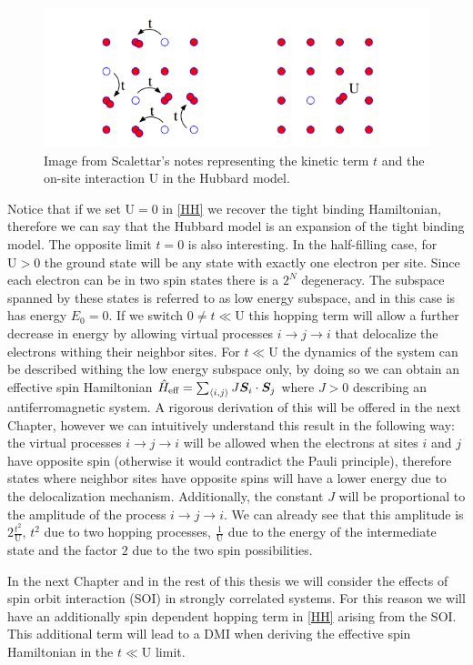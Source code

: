 \begin{figure}
\centering
  \includegraphics[width=\linewidth]{../Figures/hubbard.png}
  \caption{Image from Scalettar's notes representing the kinetic term $t$ and the on-site interaction $\text{U}$ in the Hubbard model.} 
\label{fig:Hubbard}
\end{figure}
Notice that if we set $\text{U}=0$ in \ref{HH} we recover the tight binding Hamiltonian, therefore we can say that the Hubbard model is an expansion of the tight binding model. The opposite limit $t=0$ is also interesting. In the half-filling case, for $\text{U}>0$ the ground state will be any state with exactly one electron per site. Since each electron can be in two spin states there is a $2^N$ degeneracy. The subspace spanned by these states is referred to as low energy subspace, and in this case is has energy $E_0 = 0$. If we switch $0 \neq t \ll \text{U}$ this hopping term will allow a further decrease in energy by allowing virtual processes $i \rightarrow j \rightarrow i$ that delocalize the electrons withing their neighbor sites. For $t \ll \text{U}$ the dynamics of the system can be described withing the low energy subspace only, by doing so we can obtain an effective spin Hamiltonian $\hat{H}_{\text{eff}} = \sum_{\langle i,j \rangle} J \boldsymbol{S}_i\cdot\boldsymbol{S}_j$ where $J>0$ describing an antiferromagnetic system. A rigorous derivation of this will be offered in the next Chapter, however we can intuitively understand this result in the following way: the virtual processes $i \rightarrow j \rightarrow i$ will be allowed when the electrons at sites $i$ and $j$ have opposite spin (otherwise it would contradict the Pauli principle), therefore states where neighbor sites have opposite spins will have a lower energy due to the delocalization mechanism. Additionally, the constant $J$ will be proportional to the amplitude of the process $i \rightarrow j \rightarrow i$. We can already see that this amplitude is $2\frac{t^2}{\text{U}}$, $t^2$ due to two hopping processes, $\frac{1}{\text{U}}$ due to the energy of the intermediate state and the factor $2$ due to the two spin possibilities.

In the next Chapter and in the rest of this thesis we will consider the effects of spin orbit interaction (SOI) in strongly correlated systems. For this reason we will have an additionally spin dependent hopping term in \ref{HH} arising from the SOI. This additional term will lead to a DMI when deriving the effective spin Hamiltonian in the $t \ll \text{U}$ limit.






